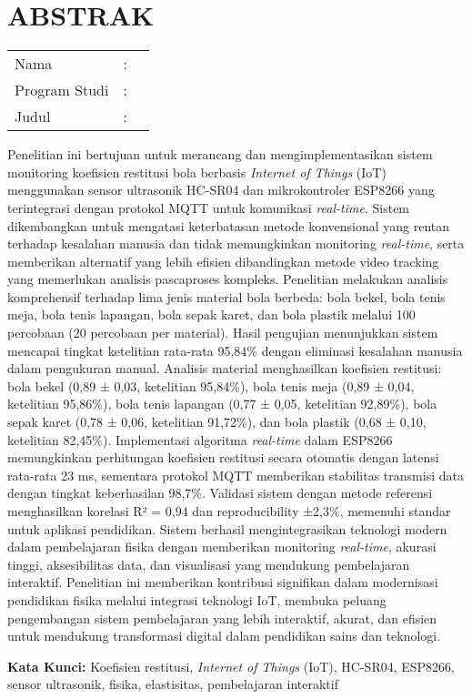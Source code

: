 \chapter*{ABSTRAK} 

\vspace{-2em} %

\begin{table}[htbp]
\begin{tabular}{l l p{10cm}}
	Nama &:& \penulis\\
	Program Studi &:& \jurusan \\
	Judul &:& \judul
\end{tabular}
\end{table}

Penelitian ini bertujuan untuk merancang dan mengimplementasikan sistem monitoring koefisien restitusi bola berbasis \textit{Internet of Things} (IoT) menggunakan sensor ultrasonik HC-SR04 dan mikrokontroler ESP8266 yang terintegrasi dengan protokol MQTT untuk komunikasi \textit{real-time}. Sistem dikembangkan untuk mengatasi keterbatasan metode konvensional yang rentan terhadap kesalahan manusia dan tidak memungkinkan monitoring \textit{real-time}, serta memberikan alternatif yang lebih efisien dibandingkan metode video tracking yang memerlukan analisis pascaproses kompleks. Penelitian melakukan analisis komprehensif terhadap lima jenis material bola berbeda: bola bekel, bola tenis meja, bola tenis lapangan, bola sepak karet, dan bola plastik melalui 100 percobaan (20 percobaan per material). Hasil pengujian menunjukkan sistem mencapai tingkat ketelitian rata-rata 95,84\% dengan eliminasi kesalahan manusia dalam pengukuran manual. Analisis material menghasilkan koefisien restitusi: bola bekel (0,89 ± 0,03, ketelitian 95,84\%), bola tenis meja (0,89 ± 0,04, ketelitian 95,86\%), bola tenis lapangan (0,77 ± 0,05, ketelitian 92,89\%), bola sepak karet (0,78 ± 0,06, ketelitian 91,72\%), dan bola plastik (0,68 ± 0,10, ketelitian 82,45\%). Implementasi algoritma \textit{real-time} dalam ESP8266 memungkinkan perhitungan koefisien restitusi secara otomatis dengan latensi rata-rata 23 ms, sementara protokol MQTT memberikan stabilitas transmisi data dengan tingkat keberhasilan 98,7\%. Validasi sistem dengan metode referensi menghasilkan korelasi R² = 0,94 dan reproducibility ±2,3\%, memenuhi standar untuk aplikasi pendidikan. Sistem berhasil mengintegrasikan teknologi modern dalam pembelajaran fisika dengan memberikan monitoring \textit{real-time}, akurasi tinggi, aksesibilitas data, dan visualisasi yang mendukung pembelajaran interaktif. Penelitian ini memberikan kontribusi signifikan dalam modernisasi pendidikan fisika melalui integrasi teknologi IoT, membuka peluang pengembangan sistem pembelajaran yang lebih interaktif, akurat, dan efisien untuk mendukung transformasi digital dalam pendidikan sains dan teknologi.

\noindent\textbf{Kata Kunci:} Koefisien restitusi, \textit{Internet of Things} (IoT), HC-SR04, ESP8266, sensor ultrasonik, fisika, elastisitas, pembelajaran interaktif